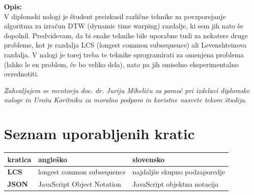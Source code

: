 \documentclass[a4paper,12pt,openright]{book}
\newcommand{\clearemptydoublepage}{\newpage{\pagestyle{empty}\cleardoublepage}}
\begin{document}
\bigskip
\noindent\textbf{Opis:}\\
V diplomski nalogi \cite{diplomaPremk} je študent preizkusil različne tehnike za povzporejanje algoritma za izračun DTW (dynamic time warping) razdalje, ki sem jih nato še dopolnil. Predvidevam, da bi enake tehnike bile uporabne tudi za nekatere druge probleme, kot je razdalja LCS (longest common subsequence) ali Levenshteinova razdalja. V nalogi je torej treba te tehnike sprogramirati za omenjena problema (lahko le en problem, če bo veliko dela), nato pa jih smiselno eksperimentalno ovrednotiti.



\vfill



\vspace{2cm}

\clearemptydoublepage

\thispagestyle{empty}\mbox{}\vfill\null\it%
\noindent
Zahvaljujem se mentorju doc. dr. Juriju Miheliču za pomoč pri izdelavi diplomske naloge in Urošu Koritniku za moralno podporo in koristne nasvete tekom študija. 
\rm\normalfont

\clearemptydoublepage

\thispagestyle{empty}\mbox{}{\textheight}\mbox{}\hfill\begin{minipage}{0.55\textwidth}%
\normalfont\end{minipage}

\clearemptydoublepage


\pagestyle{empty}
\def\thepage{}%
\tableofcontents{}


\clearemptydoublepage


\chapter*{Seznam uporabljenih kratic}

\noindent\begin{tabular}{p{}|p{}|p{}}    %
  {\bf kratica} & {\bf angleško}                              & {\bf slovensko} \\ \hline
  {\bf LCS}      & longest common subsequence               & najdaljše skupno podzaporedje \\
  {\bf JSON} & JavaScript Object Notation & JavaScript objektna notacija \\
\end{tabular}
\end{document}
